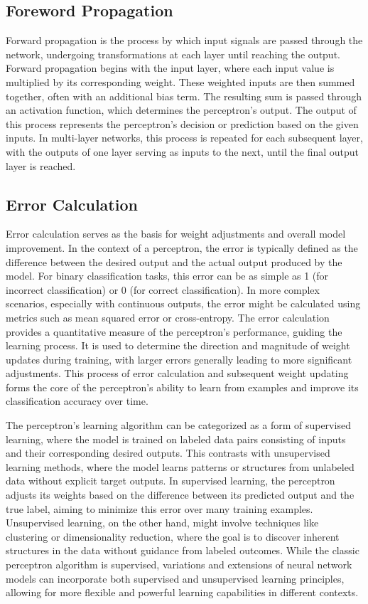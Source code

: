 \subsection{Foreword Propagation}
Forward propagation is the process by which input signals are passed through the network, undergoing transformations at each layer until reaching the output. Forward propagation begins with the input layer, where each input value is multiplied by its corresponding weight. These weighted inputs are then summed together, often with an additional bias term. The resulting sum is passed through an activation function, which determines the perceptron's output. The output of this process represents the perceptron's decision or prediction based on the given inputs. In multi-layer networks, this process is repeated for each subsequent layer, with the outputs of one layer serving as inputs to the next, until the final output layer is reached.

\subsection{Error Calculation}
Error calculation serves as the basis for weight adjustments and overall model improvement. In the context of a perceptron, the error is typically defined as the difference between the desired output and the actual output produced by the model. For binary classification tasks, this error can be as simple as 1 (for incorrect classification) or 0 (for correct classification). In more complex scenarios, especially with continuous outputs, the error might be calculated using metrics such as mean squared error or cross-entropy. The error calculation provides a quantitative measure of the perceptron's performance, guiding the learning process. It is used to determine the direction and magnitude of weight updates during training, with larger errors generally leading to more significant adjustments. This process of error calculation and subsequent weight updating forms the core of the perceptron's ability to learn from examples and improve its classification accuracy over time.

The perceptron's learning algorithm can be categorized as a form of supervised learning, where the model is trained on labeled data pairs consisting of inputs and their corresponding desired outputs. This contrasts with unsupervised learning methods, where the model learns patterns or structures from unlabeled data without explicit target outputs. In supervised learning, the perceptron adjusts its weights based on the difference between its predicted output and the true label, aiming to minimize this error over many training examples. Unsupervised learning, on the other hand, might involve techniques like clustering or dimensionality reduction, where the goal is to discover inherent structures in the data without guidance from labeled outcomes. While the classic perceptron algorithm is supervised, variations and extensions of neural network models can incorporate both supervised and unsupervised learning principles, allowing for more flexible and powerful learning capabilities in different contexts.
